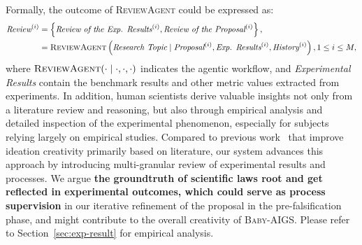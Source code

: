 \documentclass{article} %
\newcommand{\AIGSSys}{\textsc{Baby-AIGS}\xspace}
\newcommand{\ProposalAgent}{\textsc{ProposalAgent}\xspace}
\newcommand{\ReviewAgent}{\textsc{ReviewAgent}\xspace}
\begin{document}
\vspace{0.5em}

Formally, the outcome of \ReviewAgent could be expressed as:
\begin{equation}
\begin{aligned}
\textit{Review}^{(i)} &= \left\{\textit{Review of the Exp. Results}^{(i)}, \textit{Review of the Proposal}^{(i)}\right\}, \\
   & = \text{\ReviewAgent}\left(\textit{Research Topic} \mid \textit{Proposal}^{(i)}, \textit{Exp. Results}^{(i)}, \textit{History}^{(i)}\right), 1 \leq i \leq M, 
\end{aligned}
\end{equation}
where $\ReviewAgent(\cdot \mid \cdot, \cdot, \cdot)$ indicates the agentic workflow, and \textit{Experimental Results} contain the benchmark results and other metric values extracted from experiments. 
In addition, human scientists derive valuable insights not only from a literature review and reasoning, but also through empirical analysis and detailed inspection of the experimental phenomenon, especially for subjects relying largely on empirical studies. Compared to previous work~\citep{lu2024aiscientist, su2024two} that improve ideation creativity primarily based on literature, our system advances this approach by introducing multi-granular review of experimental results and processes. We argue \textbf{the groundtruth of scientific laws root and get reflected in experimental outcomes, which could serve as process supervision} in our iterative refinement of the proposal in the pre-falsification phase, and might contribute to the overall creativity of \AIGSSys. Please refer to Section~\ref{sec:exp-result} for empirical analysis.  


\end{document}
